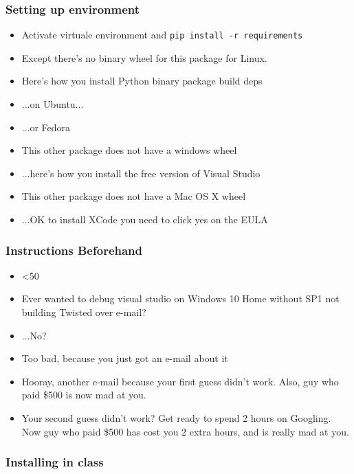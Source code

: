 \begin{frame}
\frametitle{Setting up environment}

\begin{itemize}
\item Activate virtuale environment and \verb|pip install -r requirements|
      \pause
\item Except there's no binary wheel for this package for Linux.
      \pause
\item Here's how you install Python binary package build deps
      \pause
\item ...on Ubuntu...
      \pause
\item ...or Fedora
      \pause
\item This other package does not have a windows wheel
      \pause
\item ...here's how you install the free version of Visual Studio
      \pause
\item This other package does not have a Mac OS X wheel
      \pause
\item ...OK to install XCode you need to click yes on the EULA
      \pause
\end{itemize}

\end{frame}

\begin{frame}
\frametitle{Instructions Beforehand}

\begin{itemize}
\item <50%
      \pause
\item Ever wanted to debug visual studio on Windows 10 Home
      without SP1 not building Twisted over e-mail?
      \pause
\item ...No?
      \pause
\item Too bad, because you just got an e-mail about it
      \pause
\item Hooray, another e-mail because your first guess didn't work.
      Also, guy who paid \$500 is now mad at you.
      \pause
\item Your second guess didn't work?
      Get ready to spend 2 hours on Googling.
      Now guy who paid \$500 has cost you 2 extra hours,
      and is really mad at you.
\end{itemize}

\end{frame}

\begin{frame}
\frametitle{Installing in class}


\end{frame}

